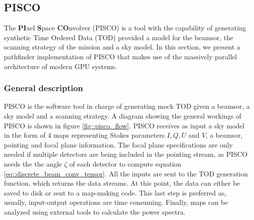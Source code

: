 \documentclass[a4paper,11pt]{article}
\begin{document}
\subsection{PISCO}

The \textbf{PI}xel \textbf{S}pace \textbf{CO}nvolver (PISCO) is a tool with the capability of generating synthetic Time Ordered Data (TOD) provided a model for the beamsor, the scanning strategy of the mission and a sky model. In this section, we present a pathfinder implementation of PISCO that makes use of the massively parallel architecture of modern GPU systems.

\subsubsection{General description}

PISCO is the software tool in charge of generating mock TOD given a beamsor, a sky model and a scanning strategy. A diagram showing the general workings of PISCO is shown in figure \ref{fig::pisco_flow}. PISCO receives as input a sky model in the form of 4 maps representing Stokes parameters $I,Q,U$ and $V$, a beamsor, pointing and focal plane information. The focal plane specifications are only needed if multiple detectors are being included in the pointing stream, as PISCO needs the the angle $\zeta$ of each detector to compute equation \ref{eq::discrete_beam_conv_tensor}. All the inputs are sent to the TOD generation function, which returns the data streams. At this point, the data can either be saved to disk or sent to a map-making code. This last step is preferred as, usually, input-output operations are time consuming. Finally, maps can be analyzed using external tools to calculate the power spectra.
\end{document}
